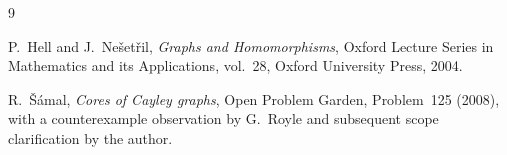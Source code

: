 \documentclass[10pt,reqno]{amsart}
\theoremstyle{definition}
\begin{document}
\begin{thebibliography}{9}

P.~Hell and J.~Ne\v{s}et\v{r}il,
\emph{Graphs and Homomorphisms},
Oxford Lecture Series in Mathematics and its Applications, vol.~28,
Oxford University Press, 2004.

R.~\v{S}\'amal,
\emph{Cores of Cayley graphs},
Open Problem Garden, Problem~125 (2008), with a counterexample observation
by G.~Royle and subsequent scope clarification by the author.

\end{thebibliography}
\end{document}
